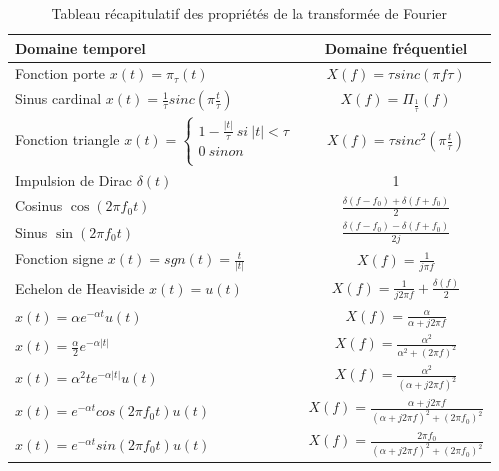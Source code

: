 	\begin{table}[h!]
		\centering
		\caption{\label{Tab:Transfo_Fourier_usuelles} Tableau récapitulatif des propriétés de la transformée de Fourier}
		\begin{tabular}{|l|c|}
			\hline
			\textbf{Domaine temporel} & \textbf{Domaine fréquentiel} \\
			\hline
			Fonction porte $x(t)=\pi_{\tau}(t)$ & $X(f)=\tau sinc(\pi f \tau)$ \\	
			\hline
			Sinus cardinal $x(t)=\frac{1}{\tau} sinc(\pi \frac{t}{\tau})$  & $X(f)=\Pi_{\frac{1}{\tau}}(f)$ \\	
			\hline
			Fonction triangle $x(t)=	\left \{
			\begin{array}{l}
			1-\frac{|t|}{\tau}~si~|t|<\tau \\
			0~sinon \\
			\end{array}
			\right .$  & $X(f)=\tau sinc^{2}(\pi \frac{t}{\tau})$ \\	
			\hline
			Impulsion de Dirac $\delta(t)$ & 1 \\	
			\hline
			Cosinus $\cos(2\pi f_0 t)$ & $\frac{\delta(f-f_0)+\delta(f+f_0)}{2}$ \\	
			\hline
			Sinus $\sin(2\pi f_0 t)$ & $\frac{\delta(f-f_0)-\delta(f+f_0)}{2j}$ \\	
			\hline
			Fonction signe $x(t)=sgn(t)=\frac{t}{|t|}$ & $X(f)=\frac{1}{j\pi f}$ \\	
			\hline
			Echelon de Heaviside $x(t)=u(t)$ & $X(f)=\frac{1}{j2\pi f} + \frac{\delta(f)}{2}$ \\	
			\hline
			$x(t)=\alpha e^{-\alpha t}u(t)$ & $X(f)=\frac{\alpha}{\alpha+j2\pi f}$ \\	
			\hline
			$x(t)=\frac{\alpha}{2} e^{-\alpha |t|}$ & $X(f)=\frac{\alpha^{2}}{\alpha^{2}+(2\pi f)^{2}}$ \\	
			\hline
			$x(t)=\alpha^{2}te^{-\alpha |t|}u(t)$ & $X(f)=\frac{\alpha^{2}}{(\alpha+j2\pi f)^{2}}$ \\	
			\hline
			$x(t)=e^{-\alpha t}cos(2 \pi f_0 t)u(t)$ & $X(f)=\frac{\alpha+j2\pi f}{(\alpha+j2\pi f)^{2}+(2\pi f_0)^{2}}$ \\	
			\hline
			$x(t)=e^{-\alpha t}sin(2 \pi f_0 t)u(t)$ & $X(f)=\frac{2\pi f_0}{(\alpha+j2\pi f)^{2}+(2\pi f_0)^{2}}$ \\	
			\hline
		\end{tabular}	
	\end{table}
	
	
